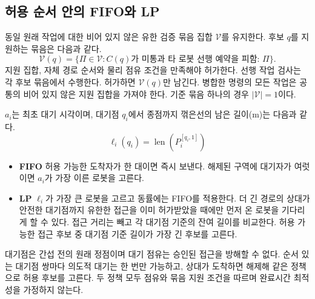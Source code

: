 \documentclass[11pt,a4paper]{article}
\theoremstyle{remark}
\begin{document}
\subsection{허용 순서 안의 FIFO와 LP}
\label{sec:two-policies}
동일 원래 작업에 대한 비어 있지 않은 유한 검증 묶음 집합 $\mathcal V$를 유지한다. 후보 $q$를 지원하는 묶음은 다음과 같다.
\begin{equation}
 \mathcal V(q)=\{\Pi\in\mathcal V:
 C(q)\text{가 미통과 타 로봇 선행 예약을 피함: }\Pi\}.
 \label{eq:certificate-support}
\end{equation}
지원 집합, 자체 경로 순서와 물리 점유 조건을 만족해야 허가한다. 선행 작업 검사는 각 후보 묶음에서 수행한다. 허가하면 $\mathcal V(q)$만 남긴다. 병합한 명령의 모든 작업은 공통의 비어 있지 않은 지원 집합을 가져야 한다. 기준 묶음 하나의 경우 $|\mathcal V|=1$이다.

$a_i$는 최초 대기 시각이며, 대기점 $q_i$에서 종점까지 꺾은선의 남은 길이(m)는 다음과 같다.
\begin{equation}
 \ell_i(q_i)=\operatorname{len}(P_i^{[q_i,1]})
 \label{eq:policy-length}
\end{equation}
\begin{itemize}
\item \textbf{FIFO} 허용 가능한 도착자가 한 대이면 즉시 보낸다. 해제된 구역에 대기자가 여럿이면 $a_i$가 가장 이른 로봇을 고른다.
\item \textbf{LP} $\ell_i$가 가장 큰 로봇을 고르고 동률에는 FIFO를 적용한다. 더 긴 경로의 상대가 안전한 대기점까지 유한한 접근을 이미 허가받았을 때에만 먼저 온 로봇을 기다리게 할 수 있다. 접근 거리는 빼고 각 대기점 기준의 잔여 길이를 비교한다. 허용 가능한 접근 후보 중 대기점 기준 길이가 가장 긴 후보를 고른다.
\end{itemize}
대기점은 간섭 전의 원래 정점이며 대기 점유는 승인된 접근을 방해할 수 없다. 순서 있는 대기점 쌍마다 의도적 대기는 한 번만 가능하고, 상대가 도착하면 해제해 같은 정책으로 허용 후보를 고른다. 두 정책 모두 점유와 묶음 지원 조건을 따르며 완료시간 최적성을 가정하지 않는다.
\end{document}
